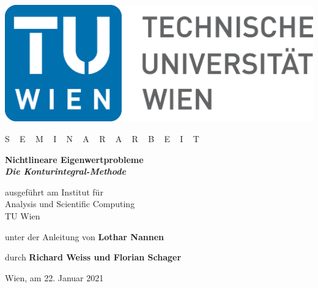 \begin{titlepage}

    \begin{center}

        \includegraphics[width = 0.5 \textwidth]{TULogo.eps}

        \vskip 1cm

        {
            \LARGE
                S ~
            \Large
                E ~ M ~ I ~ N ~ A ~ R ~ A ~ R ~ B ~ E ~ I ~ T
        }

        \vskip 1cm

        {
            \huge \bfseries
                Nichtlineare Eigenwertprobleme \\
            \vspace{0.5cm}
            \normalsize \itshape
                Die Konturintegral-Methode
        }

        \vskip 1cm

        \large
            ausgeführt am
        \vskip 0.5cm
        {
            \Large
                Institut für \\ [1ex]
                Analysis und Scientific Computing
        } \\ [1ex] {
            \Large
                TU Wien
        }

        \vskip 1cm

        unter der Anleitung von
        \vskip 0.5cm
        {
            \Large \bfseries
                Lothar Nannen
        } \\ [1ex]

        \vskip 1cm

        durch
        \vskip 0.5cm
        {
            \Large \bfseries
                Richard Weiss und Florian Schager
        }

    \end{center}

    \vfill

    \small Wien, am {22. Januar 2021}

    \vspace*{-15mm}

\end{titlepage}
